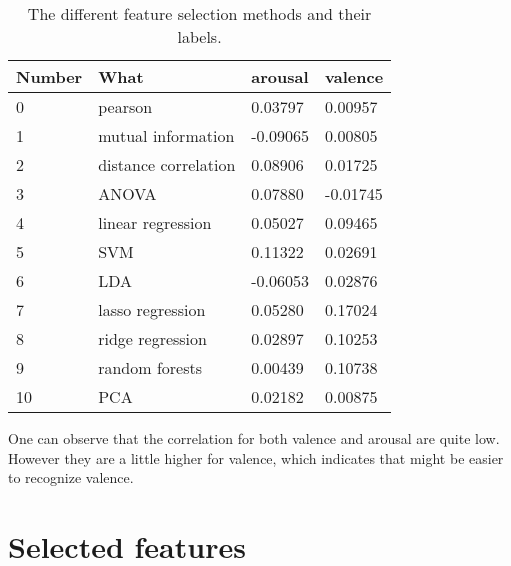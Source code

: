 \begin{table}[H]
\centering
\begin{tabular}{llll}
\textbf{Number} & \textbf{What}        & \textbf{arousal} & \textbf{valence}  \\ \hline
0               & pearson              & 0.03797          & 0.00957  \\
1               & mutual information   & -0.09065         & 0.00805  \\
2               & distance correlation & 0.08906          & 0.01725  \\
3               & ANOVA                & 0.07880          & -0.01745 \\
4               & linear regression    & 0.05027          & 0.09465  \\
5               & SVM                  & 0.11322          & 0.02691  \\
6               & LDA                  & -0.06053         & 0.02876  \\
7               & lasso regression     & 0.05280          & 0.17024  \\
8               & ridge regression     & 0.02897          & 0.10253  \\
9               & random forests       & 0.00439          & 0.10738  \\
10              & PCA                  & 0.02182          & 0.00875 
\end{tabular}
\caption{The different feature selection methods and their labels\label{corrsCompLbl}.}
\end{table}



One can observe that the correlation for both valence and arousal are quite low. However they are a little higher for valence, which indicates that might be easier to recognize valence.

\section{Selected features}

